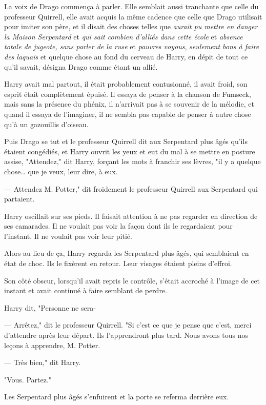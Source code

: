 La voix de Drago commença à parler. Elle semblait aussi tranchante que celle du professeur Quirrell, elle avait acquis la même cadence que celle que Drago utilisait pour imiter son père, et il disait des choses telles que \emph{aurait pu mettre en danger la Maison Serpentard} et \emph{qui sait combien d'alliés dans cette école} et \emph{absence totale de jugeote, sans parler de la ruse} et \emph{pauvres voyous}, \emph{seulement bons à faire des laquais} et quelque chose au fond du cerveau de Harry, en dépit de tout ce qu'il savait, désigna Drago comme étant un allié.

Harry avait mal partout, il était probablement contusionné, il avait froid, son esprit était complètement épuisé. Il essaya de penser à la chanson de Fumseck, mais sans la présence du phénix, il n'arrivait pas à se souvenir de la mélodie, et quand il essaya de l'imaginer, il ne sembla pas capable de penser à autre chose qu'à un gazouillis d'oiseau.

Puis Drago se tut et le professeur Quirrell dit aux Serpentard plus âgés qu'ils étaient congédiés, et Harry ouvrit les yeux et eut du mal à se mettre en posture assise, "Attendez," dit Harry, forçant les mots à franchir ses lèvres, "il y a quelque chose… que je veux, leur dire, à eux.

--- Attendez M. Potter," dit froidement le professeur Quirrell aux Serpentard qui partaient.

Harry oscillait sur ses pieds. Il faisait attention à ne pas regarder en direction de ses camarades. Il ne voulait pas voir la façon dont ils le regardaient pour l'instant. Il ne voulait pas voir leur pitié.

Alors au lieu de ça, Harry regarda les Serpentard plus âgés, qui semblaient en état de choc. Ils le fixèrent en retour. Leur visages étaient pleins d'effroi.

Son côté obscur, lorsqu'il avait repris le contrôle, s'était accroché à l'image de cet instant et avait continué à faire semblant de perdre.

Harry dit, "Personne ne sera- 

--- Arrêtez," dit le professeur Quirrell. "Si c'est ce que je pense que c'est, merci d'attendre après leur départ. Ils l'apprendront plus tard. Nous avons tous nos leçons à apprendre, M. Potter.

--- Très bien," dit Harry.

"Vous. Partez."

Les Serpentard plus âgés s'enfuirent et la porte se referma derrière eux.

